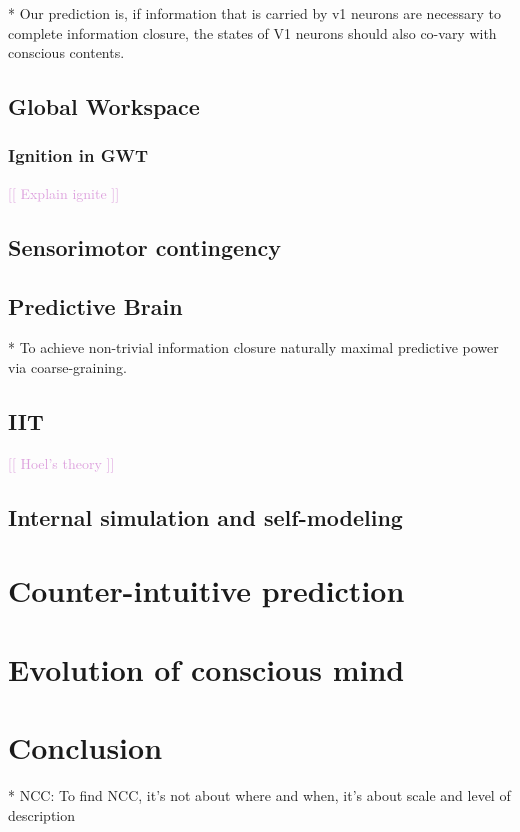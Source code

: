 \documentclass[utf8]{article}
\newcommand{\temp}[1]{\textcolor{Plum}{[[ #1 ]]\newline}}
\begin{document}
				* Our prediction is, if information that is carried by v1 neurons are necessary to complete information closure, the states of V1 neurons should also co-vary with conscious contents. 
		
		\subsection{Global Workspace}
			\subsubsection{Ignition in GWT}
				\temp{Explain ignite}
		\subsection{Sensorimotor contingency}
		\subsection{Predictive Brain}
			* To achieve non-trivial information closure naturally maximal predictive power via coarse-graining. 
			
		\subsection{IIT}
			\temp{Hoel's theory}
		\subsection{Internal simulation and self-modeling}
		
	\section{Counter-intuitive prediction}
		
	\section{Evolution of conscious mind}
		\cite{dennett2008kinds}

	\section{Conclusion}
		* NCC: To find NCC, it's not about where and when, it's about scale and level of description
	
\end{document}
